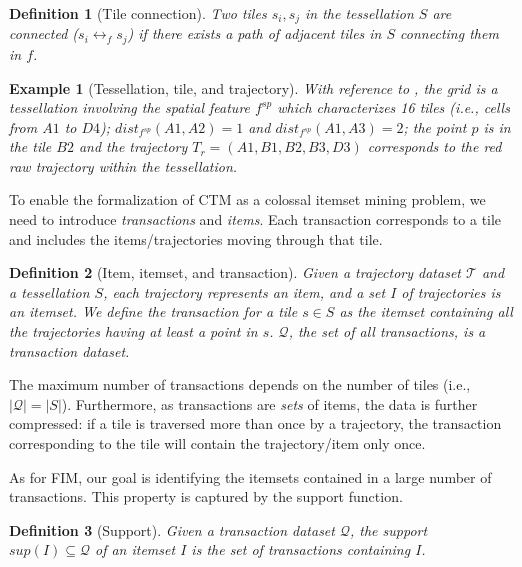 \documentclass[
]{ceurart}
\newtheorem{example}{Example}
\newtheorem{definition}{Definition}
\begin{document}
\begin{definition}[Tile connection]\label{def:adj} 
Two tiles $s_i,s_j$ in the tessellation $S$ are  \textit{connected} ($s_i \leftrightarrow_{f} s_j$) if there exists a path of adjacent tiles in $S$ connecting them in $f$.
\end{definition}

\begin{example}[Tessellation, tile, and trajectory]\label{ex:trajabst}
With reference to , the grid is a tessellation involving the spatial feature $f^{sp}$ which characterizes 16 tiles (i.e., cells from $A1$ to $D4$); $dist_{f^{sp}}(A1,A2) = 1$ and $dist_{f^{sp}}(A1,A3) = 2$; the point 
$p$ is in the tile $B2$ and the trajectory $T_r=(A1,B1,B2,B3,D3)$ corresponds to the red raw trajectory within the tessellation.
\end{example}

To enable the formalization of CTM as a colossal itemset mining problem, we need to introduce \textit{transactions} and \textit{items}.
Each transaction corresponds to a tile and includes the items/trajectories moving through that tile.

\begin{definition}[Item, itemset, and transaction] Given a trajectory dataset $\mathcal{T}$ and a tessellation $S$, each trajectory represents an \textit{item}, and a set $I$ of trajectories is an \textit{itemset}.
We define the \textit{transaction} for a tile $s \in S$ as the itemset containing all the trajectories having at least a point in $s$.
$\mathcal{Q}$, the set of all transactions, is a transaction dataset.
\end{definition}

The maximum number of transactions depends on the number of tiles (i.e., $|\mathcal{Q}| = |S|$).
Furthermore, as transactions are \textit{sets} of items, the data is further compressed: if a tile is traversed more than once by a trajectory, the transaction corresponding to the tile will contain the trajectory/item only once.

As for FIM, our goal is identifying the itemsets contained in a large number of transactions.
This property is captured by the support function.

\begin{definition}[Support]
Given a transaction dataset $\mathcal{Q}$, the \textit{support} $sup(I)\subseteq\mathcal{Q}$ of an itemset $I$ is the set of transactions containing $I$.
\end{definition}
\end{document}
